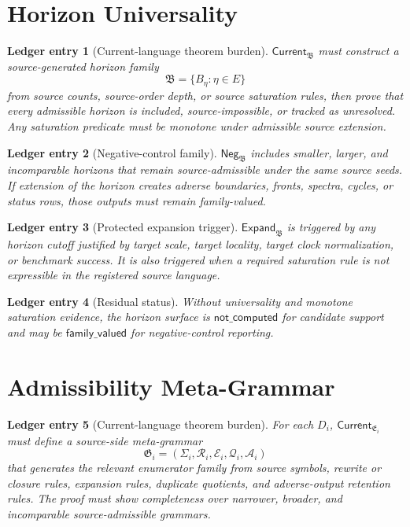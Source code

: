 \documentclass[11pt]{article}
\newcommand{\HorizonFam}{\mathfrak{B}}
\newcommand{\EnumFam}{\mathfrak{E}}
\newcommand{\MetaG}{\mathfrak{G}}
\newcommand{\Neg}{\mathsf{Neg}}
\newcommand{\Current}{\mathsf{Current}}
\newcommand{\Expand}{\mathsf{Expand}}
\newtheorem{ledgerentry}{Ledger entry}
\begin{document}
\section{Horizon Universality}

\begin{ledgerentry}[Current-language theorem burden]
\(\Current_{\HorizonFam}\) must construct a source-generated horizon family
\[
\HorizonFam=\{B_\eta:\eta\in E\}
\]
from source counts, source-order depth, or source saturation rules, then
prove that every admissible horizon is included, source-impossible, or
tracked as unresolved. Any saturation predicate must be monotone under
admissible source extension.
\end{ledgerentry}

\begin{ledgerentry}[Negative-control family]
\(\Neg_{\HorizonFam}\) includes smaller, larger, and incomparable horizons
that remain source-admissible under the same source seeds. If extension of
the horizon creates adverse boundaries, fronts, spectra, cycles, or status
rows, those outputs must remain family-valued.
\end{ledgerentry}

\begin{ledgerentry}[Protected expansion trigger]
\(\Expand_{\HorizonFam}\) is triggered by any horizon cutoff justified by
target scale, target locality, target clock normalization, or benchmark
success. It is also triggered when a required saturation rule is not
expressible in the registered source language.
\end{ledgerentry}

\begin{ledgerentry}[Residual status]
Without universality and monotone saturation evidence, the horizon surface is
\(\mathsf{not\_computed}\) for candidate support and may be
\(\mathsf{family\_valued}\) for negative-control reporting.
\end{ledgerentry}

\section{Admissibility Meta-Grammar}

\begin{ledgerentry}[Current-language theorem burden]
For each \(D_i\), \(\Current_{\EnumFam_i}\) must define a source-side
meta-grammar
\[
\MetaG_i=(\Sigma_i,\mathcal{R}_i,\mathcal{E}_i,\mathcal{Q}_i,\mathcal{A}_i)
\]
that generates the relevant enumerator family from source symbols, rewrite or
closure rules, expansion rules, duplicate quotients, and adverse-output
retention rules. The proof must show completeness over narrower, broader,
and incomparable source-admissible grammars.
\end{ledgerentry}
\end{document}
